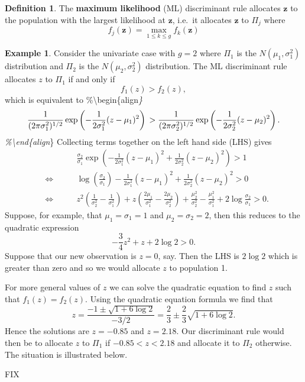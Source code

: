 \documentclass[]{book}
\theoremstyle{definition}
\newtheorem{definition}{Definition}[chapter]
\theoremstyle{definition}
\newtheorem{example}{Example}[chapter]
\theoremstyle{definition}
\theoremstyle{remark}
\begin{document}
\begin{definition}
\protect\hypertarget{def:maxlik}{}{\label{def:maxlik} }The \textbf{maximum likelihood} (ML) discriminant rule
allocates \(\boldsymbol z\) to the population with the largest likelihood at \(\boldsymbol z\), i.e.~it allocates \(\boldsymbol z\) to \(\Pi_j\) where
\[ f_j(\boldsymbol z)= \max\limits_{1 \leq k \leq g} f_k(\boldsymbol z) \]
\end{definition}

\begin{example}
\protect\hypertarget{exm:exnine1}{}{\label{exm:exnine1} }Consider the univariate case with \(g=2\) where \(\Pi_1\) is the \(N(\mu_1,\sigma_1^2)\) distribution and \(\Pi_2\) is the \(N(\mu_2,\sigma_2^2)\) distribution. The ML discriminant rule allocates \(z\) to \(\Pi_1\) if and only if
\[
f_1(z) > f_2(z) ,
\]
which is equivalent to
\%\textbackslash{}begin\{align\emph{\}
\[
\frac{1}{(2\pi\sigma_1^2)^{1/2}} \exp \left(-\frac{1}{2\sigma_1^2} (z-\mu_1)^2 \right)\\
> \frac{1}{(2\pi\sigma_2^2)^{1/2}} \exp \left(-\frac{1}{2\sigma_2^2} (z-\mu_2)^2 \right).
\]
\%\textbackslash{}end\{align}\}
Collecting terms together on the left hand side (LHS) gives
\begin{eqnarray*}
&&  \qquad \frac{\sigma_2}{\sigma_1} \exp \left(-\frac{1}{2\sigma_1^2} (z - \mu_1)^2 +\frac{1}{2\sigma_2^2} (z - \mu_2)^2 \right)> 1 \\
&\iff& \qquad \log \left(\frac{\sigma_2}{\sigma_1} \right)-\frac{1}{2\sigma_1^2} (z - \mu_1)^2 + \frac{1}{2\sigma_2^2} (z - \mu_2)^2 > 0 \\
& \iff & \qquad z^2 \left(\frac{1}{\sigma_2^2} - \frac{1}{\sigma_1^2} \right)
+ z \left(\frac{2 \mu_1}{\sigma_1^2} - \frac{2 \mu_2}{\sigma_2^2} \right)+ \frac{\mu_2^2}{\sigma_2^2} - \frac{\mu_1^2}{\sigma_1^2} + 2 \log \frac{\sigma_2}{\sigma_1} > 0.
\end{eqnarray*}
Suppose, for example, that \(\mu_1 = \sigma_1 = 1\) and \(\mu_2 = \sigma_2 = 2\), then this reduces to the quadratic expression
\[ -\frac{3}{4}z^2 + z + 2 \log 2 > 0.\]
Suppose that our new observation is \(z=0\), say. Then the LHS is \(2 \log 2\) which is greater than zero and so we would allocate \(z\) to population 1.

For more general values of \(z\) we can solve the quadratic equation to find \(z\) such that \(f_1(z)=f_2(z)\). Using the quadratic equation formula we find that
\[z = \frac{-1 \pm \sqrt{1+6 \log 2}}{-3/2} = \frac{2}{3} \pm \frac{2}{3} \sqrt{1 + 6 \log 2}.\] Hence the solutions are \(z = -0.85\) and \(z = 2.18\). Our discriminant rule would then be to allocate \(z\) to \(\Pi_1\) if \(-0.85 < z < 2.18\) and allocate it to \(\Pi_2\) otherwise. The situation is illustrated below.

FIX
\end{example}
\end{document}
